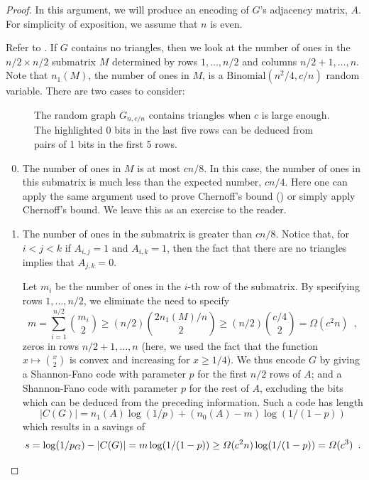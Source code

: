 \documentclass{patmorin}
\begin{document}
\begin{proof}
  In this argument, we will produce an encoding of $G$'s adjacency
  matrix, $A$. For simplicity of exposition, we assume that $n$ is
  even.

  Refer to .  If $G$ contains no triangles, then we
  look at the number of ones in the $n/2\times n/2$ submatrix $M$
  determined by rows $1,\ldots,n/2$ and columns $n/2+1,\ldots,n$. Note
  that $n_1(M)$, the number of ones in $M$, is a
  $\mathrm{Binomial}(n^2/4, c/n)$ random variable.  There are two
  cases to consider:
  
  \begin{figure}
    \caption{The random graph $G_{n,c/n}$ contains triangles when $c$
      is large enough.  The highlighted 0 bits in the last five rows
      can be deduced from pairs of 1 bits in the first 5 rows.}
  \end{figure}

  \begin{enumerate}\setcounter{enumi}{-1}
  \item The number of ones in $M$ is at most $cn/8$.  In this case,
    the number of ones in this submatrix is much less than the
    expected number, $cn/4$.  Here one can apply the same argument
    used to prove Chernoff's bound () or simply apply
    Chernoff's bound. We leave this as an exercise to the reader.

  \item The number of ones in the submatrix is greater than $cn/8$.
    Notice that, for $i<j<k$ if $A_{i,j}=1$ and $A_{i,k}=1$, then the
    fact that there are no triangles implies that $A_{j,k}=0$.

    Let $m_i$ be the number of ones in the $i$-th row of the
    submatrix.  By specifying rows $1,\ldots,n/2$, we eliminate the
    need to specify
    \[
      m = \sum_{i=1}^{n/2}\binom{m_i}{2} \ge (n/2) \binom{2
        n_1(M)/n}{2} \ge (n/2)\binom{c/4}{2} = \varOmega(c^2n) \enspace ,
    \]
    zeros in rows $n/2+1,\ldots,n$ (here, we used the fact that the
    function $x \mapsto \binom{x}{2}$ is convex and increasing for $x \geq 1/4$).
    We thus encode $G$ by giving a
    Shannon-Fano code with parameter $p$ for the first $n/2$ rows of
    $A$; and a Shannon-Fano code with parameter $p$ for the rest of
    $A$, excluding the bits which can be deduced from the preceding
    information. Such a code has length
    \[
      |C(G)| = n_1(A) \log(1/p) + (n_0(A)-m)\log(1/(1-p))
    \]
    which results in a savings of
    \[
      s = \log(1/p_G) - |C(G)| = m\log(1/(1-p)) \ge
      \varOmega(c^2n)\log(1/(1-p)) = \varOmega(c^3) \enspace . \qedhere
    \]
  \end{enumerate}
\end{proof}
\end{document}
